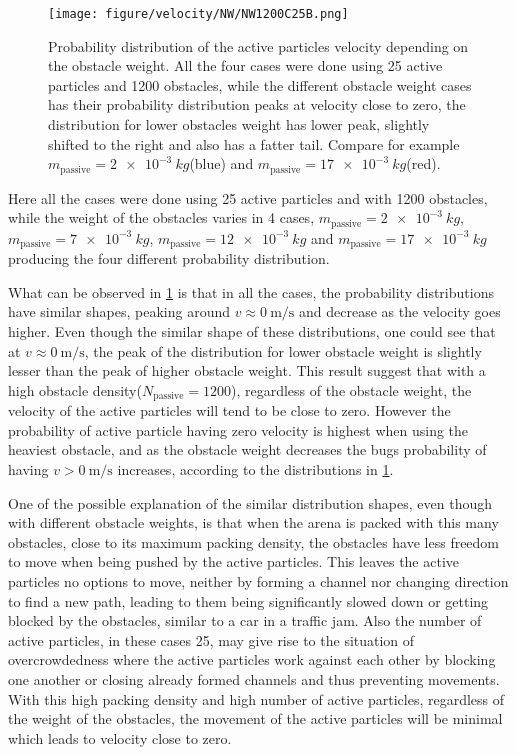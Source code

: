 \begin{figure}[htpb]
    \centering
    \captionsetup{justification=centering,margin=2cm}
    \texttt{[image: figure/velocity/NW/NW1200C25B.png]}
    \caption{Probability distribution of the active particles velocity depending on the 
    obstacle weight. All the four cases were done using 25 active 
    particles and 1200 obstacles, while the different obstacle weight cases has their 
    probability distribution peaks at velocity close to zero, the distribution for lower 
    obstacles weight has lower peak, slightly shifted to the right and also has a fatter tail. 
    Compare for example $m_{\text{passive}}=\SI{2e-3}{kg}$(blue) and $m_{\text{passive}}=\SI{17e-3}{kg}$(red).}
    \label{fig:velkde_NW1200C25B}
\end{figure}

Here all the cases were done using 25 active particles and with 1200 obstacles, while 
the weight of the obstacles varies in 4 cases, $m_{\text{passive}}=\SI{2e-3}{kg}$, 
$m_{\text{passive}}=\SI{7e-3}{kg}$, $m_{\text{passive}}=\SI{12e-3}{kg}$ and 
$m_{\text{passive}}=\SI{17e-3}{kg}$ producing the four different probability distribution.

What can be observed in \cref{fig:velkde_NW1200C25B} 
is that in all the cases, the probability distributions have similar shapes, peaking around $v\approx\SI{0}{\metre\per\second}$ 
and decrease as the velocity goes higher. Even though the similar shape of these distributions, 
one could see that at $v\approx\SI{0}{\metre\per\second}$, 
the peak of the distribution for lower obstacle weight is slightly lesser than the peak of higher obstacle weight. 
This result suggest that with a high obstacle density($N_{\text{passive}}=1200$), regardless of the obstacle weight, 
the velocity of the active particles will tend to 
be close to zero. However the probability of active particle having zero velocity is highest when using the heaviest obstacle, 
and as the obstacle weight decreases the bugs probability of having $v>\SI{0}{\metre\per\second}$ increases, according 
to the distributions in \cref{fig:velkde_NW1200C25B}.

One of the possible explanation of the similar distribution shapes, even though with different obstacle weights, is that when the arena
is packed with this many obstacles, close to its maximum packing density, the obstacles have less freedom to move 
when being pushed by the active particles. This leaves the active particles no options to move, neither 
by forming a channel nor changing direction to find a new path, leading to them being significantly 
slowed down or getting blocked by the obstacles, similar to a car in a traffic jam. 
Also the number of active particles, in these cases 25, 
may give rise to the situation of overcrowdedness where the active particles work against each other 
by blocking one another or closing already formed channels and thus preventing movements. 
With this high packing density and high number of active particles, regardless of the weight of the 
obstacles, the movement of the active particles will be minimal which leads to velocity close to zero.


